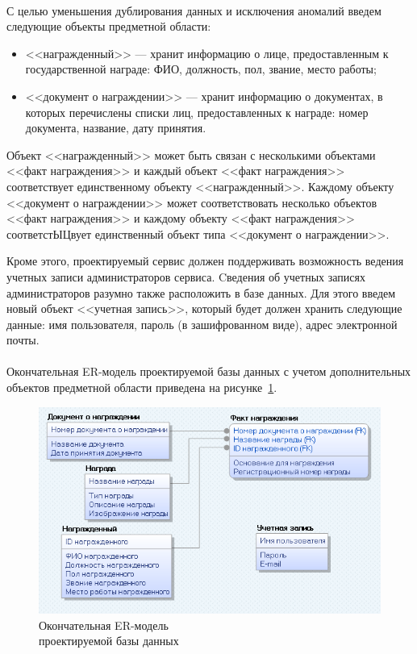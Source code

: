 \paragraph{}
С целью уменьшения дублирования данных и исключения аномалий введем
следующие объекты предметной области:

\begin{itemize}
\item <<награжденный>> --- хранит информацию о лице, предоставленным
  к государственной награде: ФИО, должность, пол, звание, место работы;
\item <<документ о награждении>> --- хранит информацию о документах,
  в которых перечислены списки лиц, предоставленных к награде: номер документа,
  название, дату принятия.
\end{itemize}

Объект <<награжденный>> может быть связан с несколькими
объектами <<факт награждения>> и каждый объект <<факт награждения>> 
соответствует единственному объекту <<награжденный>>.
Каждому объекту <<документ о награждении>> может соответствовать несколько
объектов <<факт награждения>> и каждому объекту <<факт награждения>> 
соответстЫЦвует единственный объект типа <<документ о награждении>>.

Кроме этого, проектируемый сервис должен поддерживать возможность ведения
учетных записи администраторов сервиса.
Cведения об учетных записях администраторов разумно также
расположить в базе данных. Для этого введем новый объект <<учетная запись>>,
который будет должен хранить следующие данные:
имя пользователя, пароль (в зашифрованном виде), адрес электронной почты.

\paragraph{}
Окончательная ER-модель проектируемой базы данных с учетом
дополнительных объектов предметной области приведена
на рисунке~\ref{fig:er_final}.

\begin{figure}[h]
  \centering
  \includegraphics[width=130mm]{pic/er_final.png}
  \caption{Окончательная ER-модель \\ проектируемой базы данных}
  \label{fig:er_final}
\end{figure}


